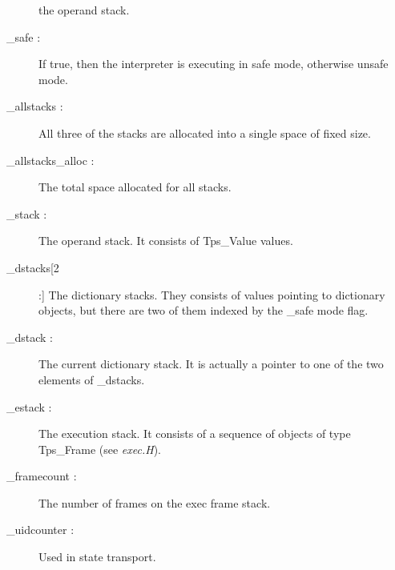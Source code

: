 \begin{description}
the operand stack.
\item[\_safe :]
If true, then the interpreter is executing in safe mode, otherwise
unsafe mode.
\item[\_allstacks :]
All three of the stacks are allocated into a single space of fixed size.
\item[\_allstacks\_alloc :]
The total space allocated for all stacks.
\item[\_stack :]
The operand stack.  It consists of Tps\_Value values.
\item[\_dstacks[2] :]
The dictionary stacks.
They consists of values pointing to dictionary objects, but there are two
of them indexed by the \_safe mode flag.
\item[\_dstack :]
The current dictionary stack.
It is actually a pointer to one of the two elements of \_dstacks.
\item[\_estack :]
The execution stack.  It consists of a sequence of objects of type
Tps\_Frame (see {\em exec.H}).
\item[\_framecount :]
The number of frames on the exec frame stack.
\item[\_uidcounter :]
Used in state transport. 
\end{description}
\clearpage

